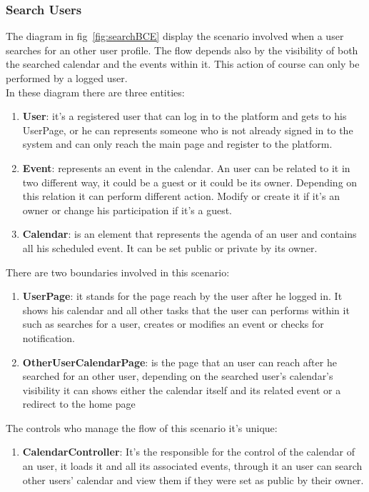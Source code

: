 \subsubsection{Search Users}
The diagram in fig~\ref{fig:searchBCE} display the scenario involved when a user searches for an other user profile. The flow depends also by the visibility of both the searched calendar and the events within it. This action of course can only be performed by a logged user.\\
In these diagram there are three entities:
\begin{enumerate}
\item  {\bf User}: it's a registered user that can log in to the platform and gets to his UserPage, or he can  represents someone who is not already signed in  to the system and can only reach the main page and register to the platform.
\item  {\bf Event}: represents an event in the calendar. An user can be related to it in two different way, it could be a guest or it could be its owner. Depending on this relation it can perform different action. Modify or create it if it's an owner or change his participation if it's a guest.
\item {\bf Calendar}: is an element that represents the agenda of an user and contains all his scheduled event. It can be set public or private by its owner.
\end{enumerate}
There are two boundaries involved in this scenario: \begin{enumerate}
\item {\bf UserPage}: it stands for the page reach by the user after he logged in. It shows his calendar and all other tasks that the user can performs within it such as searches for a user, creates or modifies an event or checks for notification.
 \item {\bf OtherUserCalendarPage}: is the page that an user can reach after he searched for an other user, depending on the searched user's calendar's visibility it can shows either the calendar itself and its related event or a redirect to the home page
 \end{enumerate}
The controls who manage the flow of this scenario it's unique:\begin{enumerate}
\item  {\bf CalendarController}: It's the responsible for the control of the calendar of an user, it loads it and all its associated events, through it an user can search other users' calendar and view them if they were set as public by their owner.

\end{enumerate}
